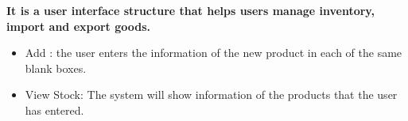 \vspace{1cm}
\textbf{It is a user interface structure that helps users manage inventory, import and export goods.}
\begin{itemize}
    \item Add : the user enters the information of the new product in each of the same blank boxes.
    \item View Stock: The system will show information of the products that the user has entered.
 
\end{itemize}

